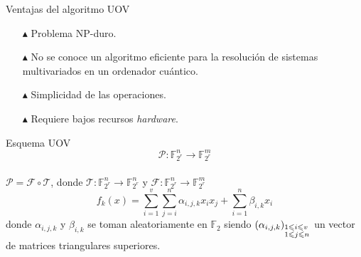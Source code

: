 \documentclass[10pt,aspectratio=169,]{beamer}
\begin{document}
\begin{frame}[c]{Ventajas del algoritmo UOV}
	\begin{itemize}
		\item[$\blacktriangle$] Problema NP-duro.
		\item[$\blacktriangle$] No se conoce un algoritmo eficiente para la resolución de sistemas multivariados en un ordenador cuántico.
		\item[$\blacktriangle$] Simplicidad de las operaciones.
		\item[$\blacktriangle$] Requiere bajos recursos \textit{hardware}.
	\end{itemize}
\end{frame}


\begin{frame}[c]{Esquema UOV}
	$$\mathcal{P}: \mathds{F}_{2^r}^n \rightarrow \mathds{F}_{2^r}^m$$\\
	\vfill
	$\mathcal{P} = \mathcal{F} \circ \mathcal{T}$, donde $\mathcal{T}: \mathds{F}_{2^r}^n \rightarrow \mathds{F}_{2^r}^n$  y $\mathcal{F}: \mathds{F}_{2^r}^n \rightarrow \mathds{F}_{2^r}^m$\\
	\vfill
	\begin{equation}\label{eq:fun}
		f_k(x) = \sum_{i=1}^v \sum_{j=i}^n \alpha_{i,j,k} x_i x_j + \sum_{i=1}^n \beta_{i,k} x_i
	\end{equation}
	donde $\alpha_{i,j,k}$ y $\beta_{i,k}$ se toman aleatoriamente en $\mathds{F}_2$ siendo $\left(\alpha_{i,j,k}\right)_{\begin{subarray}{l}{1\leqslant i \leqslant v }\\ {1 \leqslant j \leqslant n}\end{subarray}}$ un vector de matrices triangulares superiores.
\end{frame}
\end{document}
